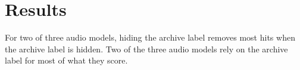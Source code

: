 \section{Results}
For two of three audio models, hiding the archive label removes most hits when the archive label is hidden. Two of the three audio models rely on the archive label for most of what they score.
